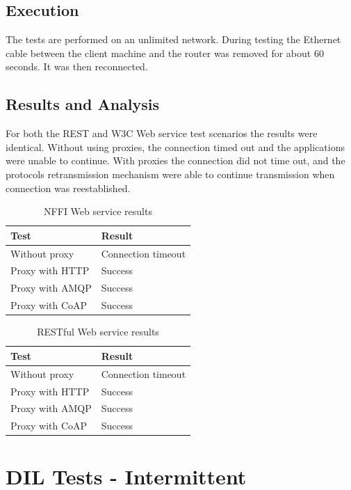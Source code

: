 \subsection{Execution}

 The tests are performed on an unlimited network. During testing the Ethernet
 cable between the client machine and the router was removed for about 60
 seconds. It was then reconnected.

\subsection{Results and Analysis}

For both the REST and W3C Web service test scenarios the results were identical.
Without using proxies, the connection timed out and the applications were unable
to continue. With proxies the connection did not time out, and the protocols
retransmission mechanism were able to continue transmission when connection was
reestablished.

\begin{table}[h!]
\begin{tabular}{| l | l |}
\hline
  \textbf{Test} & \textbf{Result} \\ \hline
  Without proxy & Connection timeout \\ \hline
  Proxy with HTTP & Success \\ \hline
  Proxy with AMQP & Success \\ \hline
  Proxy with CoAP & Success \\ \hline
\end{tabular}
\caption{NFFI Web service results}
\end{table}

\begin{table}[h!]
\begin{tabular}{| l | l |}
\hline
  \textbf{Test} & \textbf{Result} \\ \hline
  Without proxy & Connection timeout \\ \hline
  Proxy with HTTP & Success \\ \hline
  Proxy with AMQP & Success \\ \hline
  Proxy with CoAP & Success \\ \hline
\end{tabular}
\caption{RESTful Web service results}
\end{table}



\section{DIL Tests - Intermittent}

